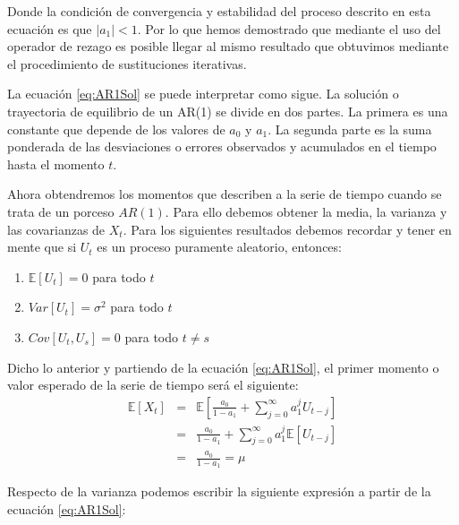 \documentclass[
]{book}
\providecommand{\tightlist}{%
  \setlength{\itemsep}{0pt}\setlength{\parskip}{0pt}}
\begin{document}
Donde la condición de convergencia y estabilidad del proceso descrito en
esta ecuación es que \(\lvert a_1 \lvert < 1\). Por lo que hemos
demostrado que mediante el uso del operador de rezago es posible llegar
al mismo resultado que obtuvimos mediante el procedimiento de
sustituciones iterativas.

La ecuación \eqref{eq:AR1Sol} se puede interpretar como sigue. La
solución o trayectoria de equilibrio de un AR(1) se divide en dos
partes. La primera es una constante que depende de los valores de \(a_0\)
y \(a_1\). La segunda parte es la suma ponderada de las desviaciones o
errores observados y acumulados en el tiempo hasta el momento \(t\).

Ahora obtendremos los momentos que describen a la serie de tiempo cuando
se trata de un porceso \(AR(1)\). Para ello debemos obtener la media, la
varianza y las covarianzas de \(X_t\). Para los siguientes resultados
debemos recordar y tener en mente que si \(U_t\) es un proceso puramente
aleatorio, entonces:

\begin{enumerate}
\def\labelenumi{\arabic{enumi}.}
\tightlist
\item
  \(\mathbb{E}[U_t] = 0\) para todo \(t\)
\item
  \(Var[U_t] = \sigma^2\) para todo \(t\)
\item
  \(Cov[U_t, U_s] = 0\) para todo \(t \neq s\)
\end{enumerate}

Dicho lo anterior y partiendo de la ecuación \eqref{eq:AR1Sol}, el primer
momento o valor esperado de la serie de tiempo será el siguiente:
\begin{eqnarray}
\mathbb{E}[X_t] & = & \mathbb{E} \left[ \frac{a_0}{1 - a_1} + \sum^{\infty}_{j = 0} a_1^j U_{t-j} \right] \nonumber \\
    & = & \frac{a_0}{1 - a_1} + \sum^{\infty}_{j = 0} a_1^j \mathbb{E}[U_{t-j}] \nonumber \\
    & = & \frac{a_0}{1 - a_1} = \mu
    \label{eq:AR1m1}
\end{eqnarray}

Respecto de la varianza podemos escribir la siguiente expresión a partir
de la ecuación \eqref{eq:AR1Sol}:
\end{document}
